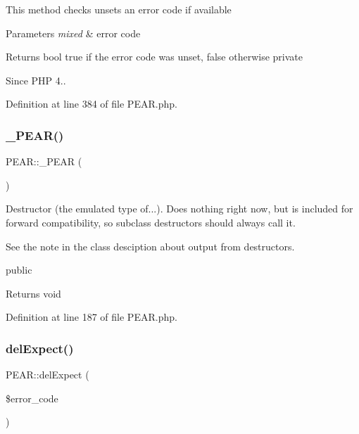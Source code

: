 This method checks unsets an error code if available


\begin{DoxyParams}{Parameters}
{\em mixed} & error code \\
\hline
\end{DoxyParams}
\begin{DoxyReturn}{Returns}
bool true if the error code was unset, false otherwise  private 
\end{DoxyReturn}
\begin{DoxySince}{Since}
P\+HP 4.. 
\end{DoxySince}


Definition at line 384 of file P\+E\+A\+R.\+php.

\hypertarget{classPEAR_a282c57b5152ef70d02b3f08ad826af0a}{}\label{classPEAR_a282c57b5152ef70d02b3f08ad826af0a} 
\subsubsection{\texorpdfstring{\+\_\+\+P\+E\+A\+R()}{\_PEAR()}}
{\footnotesize\ttfamily P\+E\+A\+R\+::\+\_\+\+P\+E\+AR (\begin{DoxyParamCaption}{ }\end{DoxyParamCaption})}

Destructor (the emulated type of...). Does nothing right now, but is included for forward compatibility, so subclass destructors should always call it.

See the note in the class desciption about output from destructors.

public \begin{DoxyReturn}{Returns}
void 
\end{DoxyReturn}


Definition at line 187 of file P\+E\+A\+R.\+php.

\hypertarget{classPEAR_a8aa91fd0c4d61435587519c0417848c5}{}\label{classPEAR_a8aa91fd0c4d61435587519c0417848c5} 
\subsubsection{\texorpdfstring{del\+Expect()}{delExpect()}}
{\footnotesize\ttfamily P\+E\+A\+R\+::del\+Expect (\begin{DoxyParamCaption}\item[{}]{\$error\+\_\+code }\end{DoxyParamCaption})}

